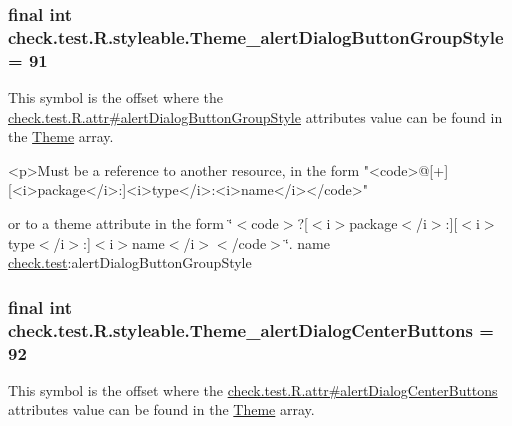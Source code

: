 \subsubsection[{Theme\+\_\+alert\+Dialog\+Button\+Group\+Style}]{\setlength{\rightskip}{0pt plus 5cm}final int check.\+test.\+R.\+styleable.\+Theme\+\_\+alert\+Dialog\+Button\+Group\+Style = 91\hspace{0.3cm}{\ttfamily [static]}}\label{classcheck_1_1test_1_1_r_1_1styleable_acba96b3fbc00ef03937429054fbe3036}
This symbol is the offset where the \hyperlink{classcheck_1_1test_1_1_r_1_1attr_abc36e528bd90cfdb9882099faa4fe301}{check.\+test.\+R.\+attr\#alert\+Dialog\+Button\+Group\+Style} attribute\textquotesingle{}s value can be found in the \hyperlink{classcheck_1_1test_1_1_r_1_1styleable_acca726d02016a0cf607782ec3a436a81}{Theme} array.

\begin{DoxyVerb}      <p>Must be a reference to another resource, in the form "<code>@[+][<i>package</i>:]<i>type</i>:<i>name</i></code>"
\end{DoxyVerb}
 or to a theme attribute in the form \char`\"{}$<$code$>$?\mbox{[}$<$i$>$package$<$/i$>$\+:\mbox{]}\mbox{[}$<$i$>$type$<$/i$>$\+:\mbox{]}$<$i$>$name$<$/i$>$$<$/code$>$\char`\"{}.  name \hyperlink{namespacecheck_1_1test}{check.\+test}\+:alert\+Dialog\+Button\+Group\+Style \hypertarget{classcheck_1_1test_1_1_r_1_1styleable_a11c37dcf3c6bf471d394d417c9aaa633}{}
\subsubsection[{Theme\+\_\+alert\+Dialog\+Center\+Buttons}]{\setlength{\rightskip}{0pt plus 5cm}final int check.\+test.\+R.\+styleable.\+Theme\+\_\+alert\+Dialog\+Center\+Buttons = 92\hspace{0.3cm}{\ttfamily [static]}}\label{classcheck_1_1test_1_1_r_1_1styleable_a11c37dcf3c6bf471d394d417c9aaa633}
This symbol is the offset where the \hyperlink{classcheck_1_1test_1_1_r_1_1attr_a6bc9e9d1de7ab7695441b316c871825c}{check.\+test.\+R.\+attr\#alert\+Dialog\+Center\+Buttons} attribute\textquotesingle{}s value can be found in the \hyperlink{classcheck_1_1test_1_1_r_1_1styleable_acca726d02016a0cf607782ec3a436a81}{Theme} array.


